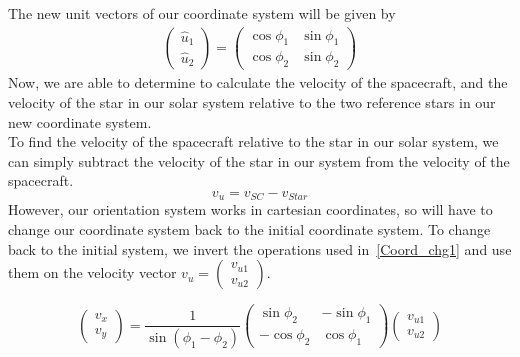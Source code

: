 \documentclass[reprint,english,notitlepage]{revtex4-2}
\begin{document}
The new unit vectors of our coordinate system will be given by
\begin{align}\label{Coord_chg1}
\begin{pmatrix}
    \hat{u}_1 \\
	\hat{u}_2
\end{pmatrix} =
\begin{pmatrix}
    \cos \phi_1 & \sin \phi_1\\
	\cos \phi_2 & \sin \phi_2
\end{pmatrix}
\end{align}
Now, we are able to determine to calculate the velocity of the spacecraft, and the velocity of the star in our solar system relative to the two reference stars in our new coordinate system.\\
To find the velocity of the spacecraft relative to the star in our solar system, we can simply subtract the velocity of the star in our system from the velocity of the spacecraft.
\[
v_u = v_{SC}-v_{Star}
\]
However, our orientation system works in cartesian coordinates, so will have to change our coordinate system back to the initial coordinate system.
To change back to the initial system, we invert the operations used in~\eqref{Coord_chg1} and use them on the velocity vector
$v_u = \begin{pmatrix}
    v_{u1}\\ v_{u2}
\end{pmatrix}$.

\[
    \begin{pmatrix}
        v_x\\
		v_y
    \end{pmatrix}
	 = \frac{1}{\sin\left(\phi_1 - \phi_2 \right)}
	\begin{pmatrix}
	    \sin \phi_2 & -\sin \phi_1\\
		-\cos \phi_2 & \cos \phi_1
	\end{pmatrix}
	\begin{pmatrix}
		v_{u1}\\ v_{u2}
	\end{pmatrix}
\]
\end{document}
